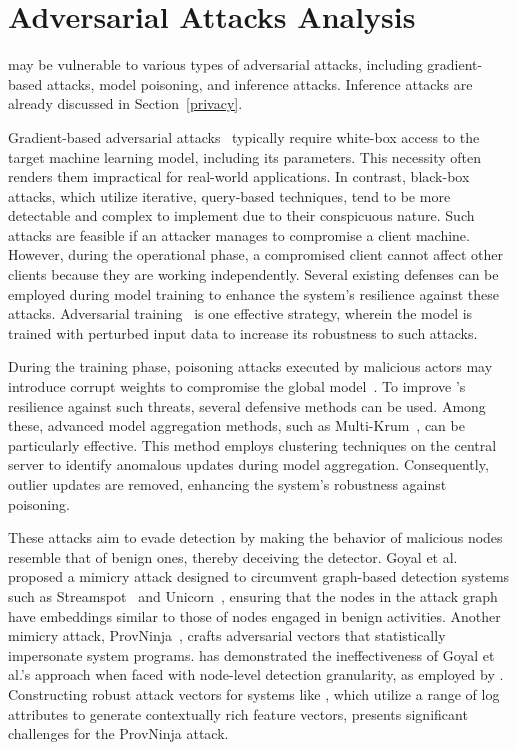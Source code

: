 \section{Adversarial Attacks Analysis}
\label{sec:adversarial}


\Sys may be vulnerable to various types of adversarial attacks, including gradient-based attacks, model poisoning, and inference attacks. Inference attacks are already discussed in Section~\ref{privacy}.

 Gradient-based adversarial attacks~\cite{chakraborty2021survey} typically require white-box access to the target machine learning model, including its parameters. This necessity often renders them impractical for real-world applications. In contrast, black-box attacks, which utilize iterative, query-based techniques, tend to be more detectable and complex to implement due to their conspicuous nature. Such attacks are feasible if an attacker manages to compromise a client machine. However, during the operational phase, a compromised client cannot affect other clients because they are working independently. Several existing defenses can be employed during model training to enhance the system's resilience against these attacks. Adversarial training~\cite{tramer2019adversarial} is one effective strategy, wherein the model is trained with perturbed input data to increase its robustness to such attacks.

 During the training phase, poisoning attacks executed by malicious actors may introduce corrupt weights to compromise the global model~\cite{jagielski2018manipulating}. To improve \Sys's resilience against such threats, several defensive methods can be used. Among these, advanced model aggregation methods, such as Multi-Krum~\cite{munoz2019byzantine}, can be particularly effective. This method employs clustering techniques on the central server to identify anomalous updates during model aggregation. Consequently, outlier updates are removed, enhancing the system's robustness against poisoning.

 These attacks aim to evade detection by making the behavior of malicious nodes resemble that of benign ones, thereby deceiving the detector. Goyal et al.~\cite{goyal2023sometimes} proposed a mimicry attack designed to circumvent graph-based detection systems such as Streamspot~\cite{streamspot} and Unicorn~\cite{han2020unicorn}, ensuring that the nodes in the attack graph have embeddings similar to those of nodes engaged in benign activities. Another mimicry attack, ProvNinja~\cite{mukherjee2023evading}, crafts adversarial vectors that statistically impersonate system programs. \flash has demonstrated the ineffectiveness of Goyal et al.'s approach when faced with node-level detection granularity, as employed by \Sys. Constructing robust attack vectors for systems like \Sys, which utilize a range of log attributes to generate contextually rich feature vectors, presents significant challenges for the ProvNinja attack.